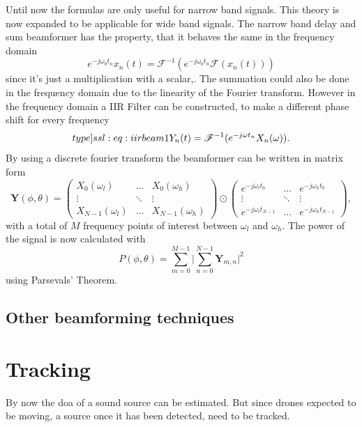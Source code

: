 Until now the formulas are only useful for narrow band signals. 
This theory is now expanded to be applicable for wide band signals.
The narrow band delay and sum beamformer has the property, that it behaves
the same in the frequency domain
\begin{equation}
	e^{-j\omega_0 t_n} x_n(t) = \mathscr{F}^{-1}(e^{-j\omega_0 t_n} \mathscr{F}(x_n(t)))
\end{equation}
since it's just a multiplication with a scalar,. 
The summation could also be done in the frequency domain due to the 
linearity of the Fourier transform.
However in the frequency domain a IIR Filter can be constructed, to 
make a different phase shift for every frequency 
\begin{equation}
	\label[type]{ssl:eq:iirbeam1}
	Y_n(t) = \mathscr{F}^{-1}(e^{-j\omega t_n} X_n(\omega)).
\end{equation}
By using a discrete fourier transform the beamformer can be written
in matrix form
\begin{equation}
	\bm{Y}(\phi, \theta) = 
	\begin{pmatrix}
		X_0(\omega_l) & \hdots & X_0(\omega_h)\\
		\vdots & \ddots & \vdots \\
		X_{N-1}(\omega_l) & \hdots & X_{N-1}(\omega_h)
	\end{pmatrix}
	\odot
	\begin{pmatrix}
		e^{-j\omega_l t_0} & \hdots & e^{-j\omega_h t_0}\\
		\vdots & \ddots & \vdots \\
		e^{-j\omega_l t_{N-1}} & \hdots & e^{-j\omega_h t_{N-1}}
	\end{pmatrix},
\end{equation}
with a total of $M$ frequency points of interest between $\omega_l$ and $\omega_h$.
The power of the signal is now calculated with
\begin{equation}
	P(\phi, \theta) =  \sum_{m=0}^{M-1}\lvert \sum_{n=0}^{N-1} \bm{Y}_{m, n} \rvert^2
\end{equation}
using Parsevals' Theorem.

\subsection{Other beamforming techniques}

\section{Tracking}
By now the \acrshort{doa} of a sound source can be estimated.
But since drones expected to be moving, a source once it has been
detected, need to be tracked.

